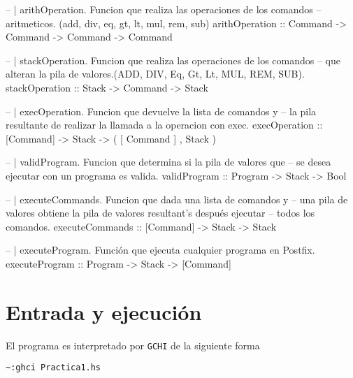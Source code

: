 \documentclass[spanish,12pt,letterpaper]{article}
\begin{document}
\begin{code}
  -- | arithOperation. Funcion que realiza las operaciones de los comandos 
  --   aritmeticos. (add, div, eq, gt, lt, mul, rem, sub)
  arithOperation :: Command -> Command -> Command -> Command

  -- | stackOperation. Funcion que realiza las operaciones de los comandos 
  --   que alteran la pila de valores.(ADD, DIV, Eq, Gt, Lt, MUL, REM, SUB).
  stackOperation :: Stack -> Command -> Stack

  -- | execOperation. Funcion que devuelve la lista de comandos y
  --   la pila resultante de realizar la llamada a la operacion con exec.
  execOperation :: [Command] -> Stack -> ( [ Command ] , Stack )

  -- | validProgram. Funcion que determina si la pila de valores que
  --   se desea ejecutar con un programa es valida.
  validProgram :: Program -> Stack -> Bool

  -- | executeCommands. Funcion que dada una lista de comandos y
  --   una pila de valores obtiene la pila de valores resultant's después ejecutar
  --   todos los comandos.
  executeCommands :: [Command] -> Stack -> Stack

  -- | executeProgram. Función que ejecuta cualquier programa en Postfix.
  executeProgram :: Program -> Stack -> [Command]

\end{code}

\section{Entrada y ejecución}

El programa es interpretado por \texttt{GCHI} de la siguiente forma
\begin{lstlisting}[]
  ~:ghci Practica1.hs
\end{lstlisting}
\end{document}

